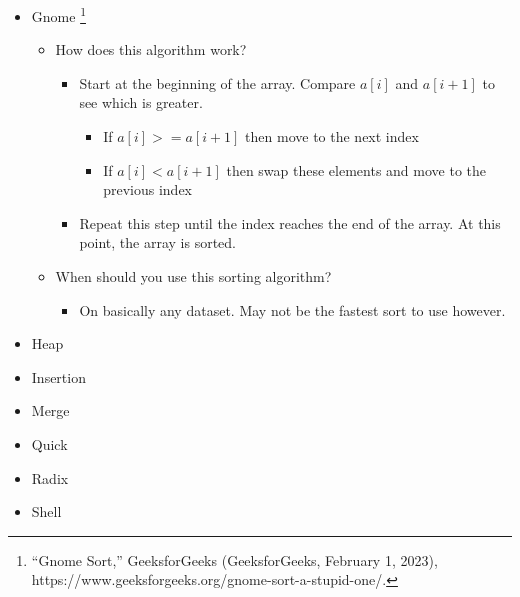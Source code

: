 \documentclass[11pt]{article}
\begin{document}
\begin{itemize}
\item{Gnome}
\footnote{“Gnome Sort,” GeeksforGeeks (GeeksforGeeks, February 1, 2023), https://www.geeksforgeeks.org/gnome-sort-a-stupid-one/.}
\begin{itemize}
\addtolength{\itemindent}{0.80cm}
\itemsep0em 
\item{How does this algorithm work?}
\begin{itemize}
\addtolength{\itemindent}{0.80cm}
\itemsep0em 
\item{Start at the beginning of the array. Compare $a[i]$ and $a[i+1]$ to see which is greater.}
\begin{itemize}
\addtolength{\itemindent}{0.80cm}
\itemsep0em 
\item{If $a[i] >= a[i+1]$ then move to the next index}
\item{If $a[i] < a[i+1]$ then swap these elements and move to the previous index} 
\end{itemize}
\item{Repeat this step until the index reaches the end of the array. At this point, the array is sorted.}
\end{itemize}
\item{When should you use this sorting algorithm?}
\begin{itemize}
\addtolength{\itemindent}{0.80cm}
\itemsep0em 
\item{On basically any dataset. May not be the fastest sort to use however.}
\end{itemize}
\end{itemize}

\item{Heap}
\item{Insertion}
\item{Merge}
\item{Quick}
\item{Radix}
\item{Shell}
\end{itemize}
\end{document}
